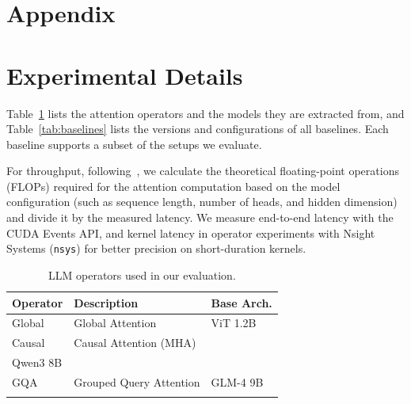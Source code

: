 \section*{Appendix}
\vspace{.3in}

\section{Experimental Details}
\label{sec:exp-details}

Table~\ref{tab:operators} lists the attention operators and the models they are extracted from,
and Table~\ref{tab:baselines} lists the versions and configurations of all baselines.
Each baseline supports a subset of the setups we evaluate.

For throughput, following~\cite{Megatron-LM}, we calculate the theoretical
floating-point operations (FLOPs) required for the attention computation
based on the model configuration (such as sequence length, number of heads, and hidden
dimension) and divide it by the measured latency.
We measure end-to-end latency with the CUDA Events API,
and kernel latency in operator experiments with Nsight Systems (\texttt{nsys})
for better precision on short-duration kernels.

\begin{table}[h]
  \small
  \centering
  \caption{LLM operators used in our evaluation. }
  \label{tab:operators}
  \begin{tabular}{l|l|l} \Xhline{2\arrayrulewidth}
    \textbf{Operator} & \textbf{Description}    & \textbf{Base Arch.} \\ \hline
    Global      & Global Attention        & ViT 1.2B \\
    Causal      & Causal Attention (MHA)  & \makecell[l]{Llama 2 7B, Qwen2 7B, \\ Qwen3 8B} \\
    GQA         & Grouped Query Attention & GLM-4 9B \\
    \Xhline{2\arrayrulewidth}
  \end{tabular}
\end{table}

